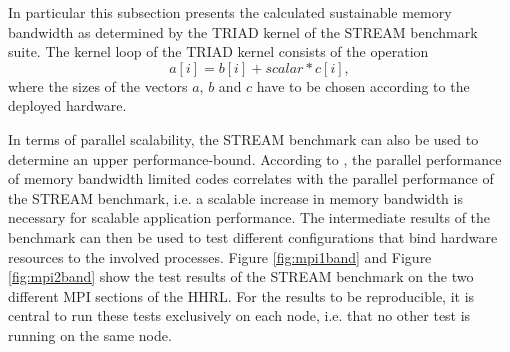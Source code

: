 In particular this subsection presents the calculated sustainable memory bandwidth as determined by the TRIAD kernel of the STREAM benchmark suite. The kernel loop of the TRIAD kernel consists of the operation
\begin{displaymath}
  a[i] = b[i] + scalar * c[i] ,
\end{displaymath}
where the sizes of the vectors \(a\), \(b\) and \(c\) have to be chosen according to the deployed hardware.

In terms of parallel scalability, the STREAM benchmark can also be used to determine an upper performance-bound. According to \cite{petsc-web-page}, the parallel performance of memory bandwidth limited codes correlates with the parallel performance of the STREAM benchmark, i.e. a scalable increase in memory bandwidth is necessary for scalable application performance. The intermediate results of the benchmark can then be used to test different configurations that bind hardware resources to the involved processes. Figure \ref{fig:mpi1band} and Figure \ref{fig:mpi2band} show the test results of the STREAM benchmark on the two different MPI sections of the HHRL. For the results to be reproducible, it is central to run these tests exclusively on each node, i.e. that no other test is running on the same node. %


%    
%
%    
%
%
%    

